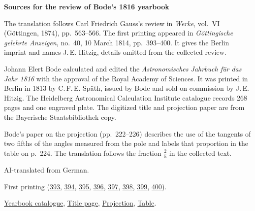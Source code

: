 \clearpage\thispagestyle{empty}
\begin{center}\Large\bfseries Sources for the review of Bode’s 1816 yearbook\end{center}

The translation follows Carl Friedrich Gauss’s review in \emph{Werke}, vol.~VI (Göttingen, 1874), pp.~563--566. The first printing appeared in \emph{Göttingische gelehrte Anzeigen}, no.~40, 10 March 1814, pp.~393--400. It gives the Berlin imprint and names J.\,E. Hitzig, details omitted from the collected review.

Johann Elert Bode calculated and edited the \emph{Astronomisches Jahrbuch für das Jahr 1816} with the approval of the Royal Academy of Sciences. It was printed in Berlin in 1813 by C.\,F.\,E. Späth, issued by Bode and sold on commission by J.\,E. Hitzig. The Heidelberg Astronomical Calculation Institute catalogue records 268 pages and one engraved plate. The digitized title and projection paper are from the Bayerische Staatsbibliothek copy.

Bode’s paper on the projection (pp.~222--226) describes the use of the tangents of two fifths of the angles measured from the pole and labels that proportion in the table on p.~224. The translation follows the fraction $\frac{2}{5}$ in the collected text.

AI-translated from German.

First printing (\href{https://images.p.sub.uni-goettingen.de/iiif/image/gdz:PPN319721507_1814:00000395/full/1650,/0/default.jpg}{393}, \href{https://images.p.sub.uni-goettingen.de/iiif/image/gdz:PPN319721507_1814:00000396/full/1650,/0/default.jpg}{394}, \href{https://images.p.sub.uni-goettingen.de/iiif/image/gdz:PPN319721507_1814:00000397/full/1650,/0/default.jpg}{395}, \href{https://images.p.sub.uni-goettingen.de/iiif/image/gdz:PPN319721507_1814:00000398/full/1650,/0/default.jpg}{396}, \href{https://images.p.sub.uni-goettingen.de/iiif/image/gdz:PPN319721507_1814:00000399/full/1650,/0/default.jpg}{397}, \href{https://images.p.sub.uni-goettingen.de/iiif/image/gdz:PPN319721507_1814:00000400/full/1650,/0/default.jpg}{398}, \href{https://images.p.sub.uni-goettingen.de/iiif/image/gdz:PPN319721507_1814:00000401/full/1650,/0/default.jpg}{399}, \href{https://images.p.sub.uni-goettingen.de/iiif/image/gdz:PPN319721507_1814:00000402/full/1650,/0/default.jpg}{400}).

\href{https://wwwadd.zah.uni-heidelberg.de/publikationen/baj/baj1816/baj1816.htm}{Yearbook catalogue}, \href{https://www.digitale-sammlungen.de/view/bsb10538345?page=5}{Title page}, \href{https://www.digitale-sammlungen.de/view/bsb10538345?page=231}{Projection}, \href{https://www.digitale-sammlungen.de/view/bsb10538345?page=232}{Table}.

\clearpage
